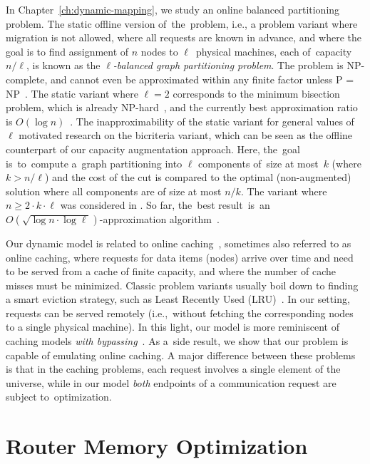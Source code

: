 In Chapter~\ref{ch:dynamic-mapping}, we study an online balanced partitioning problem.
The static offline version of~the~problem, i.e., a problem variant where
migration is not allowed, where all requests are known in advance, and where
the goal is to find assignment of $n$ nodes to $\ell$~physical machines, each of~capacity $n/\ell$, is known as the
\emph{$\ell$-balanced graph partitioning problem}. The problem is 
NP-complete, and cannot even be approximated within any finite factor unless P
= NP~\cite{AndRae06}.  The static
variant where $\ell = 2$ corresponds to the minimum bisection problem, which
is already NP-hard~\cite{GaJoSt76}, and 
the currently best approximation ratio is $O(\log n)$~\cite{SarVaz95,ArKaKa99,FeKrNi00,FeiKra02,KraFei06,Raec08}.
The inapproximability of the static variant for general values of $\ell$
motivated research on the bicriteria variant, which can be seen as the offline
counterpart of our capacity augmentation approach. Here, the~goal
is~to~compute a~graph partitioning into $\ell$ components of~size at most~$k$ (where $k > n/\ell$) and the cost of the cut is compared to the optimal (non-augmented)
solution where all components are of size at most $n/k$. The variant where
$n \geq 2 \cdot k \cdot \ell$ was considered in
\cite{LeMaTr90,SimTen97,EvNaRS00,EvNaRS99,KrNaSc09}. So far, the~best result~is~an~$O(\!\sqrt{\log n \cdot \log \ell})$-approximation algorithm~\cite{KrNaSc09}.

Our dynamic model is related to online
caching~\cite{SleTar85,FKLMSY91,McGSle91,AcChNo00}, sometimes also referred to
as online caching, where requests for data items (nodes) arrive over time and
need to be served from a cache of finite capacity, and where the number of
cache misses must be minimized. Classic problem variants usually boil down to
finding a smart eviction strategy, such as Least Recently Used (LRU)~\cite{SleTar85}. In our
setting, requests can be served remotely (i.e.,~without fetching the
corresponding nodes to a single physical machine). In this light, our model is more
reminiscent of caching models \emph{with
bypassing}~\cite{EpImLN11,EpImLN15,Irani02}. As a~side result, we show that our problem is
capable of emulating online caching.
A major difference between  these problems is that in the caching problems, each request involves a single element of the universe, while in our model \emph{both} endpoints of a communication request are subject to~optimization.



\section{Router Memory Optimization}
\label{sec:intro-packet-forwarding}


